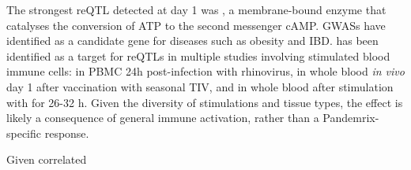 The strongest \gls{reQTL} detected at day 1 was , a membrane-bound enzyme that catalyses the conversion of ATP to the second messenger cAMP\autocite{wu2016AdenylateCyclaseNew}.
\Glspl{GWAS} have identified  as a candidate gene for diseases such as obesity\autocite{wu2016AdenylateCyclaseNew} and IBD\autocite{mcgovern2015GeneticsInflammatoryBowel}.
%
 has been identified as a target for reQTLs in multiple studies involving stimulated blood immune cells:
in \gls{PBMC} 24h post-infection with rhinovirus\autocite{caliskan2015HostGeneticVariation},
in whole blood \textit{in vivo} day 1 after vaccination with seasonal \gls{TIV}\autocite{franco2013IntegrativeGenomicAnalysis},
and in whole blood after stimulation with  for 26-32 h\autocite{manry2017DecipheringGeneticControl}.
Given the diversity of stimulations and tissue types, the effect is likely a consequence of general immune activation, rather than a Pandemrix-specific response.

Given correlated

